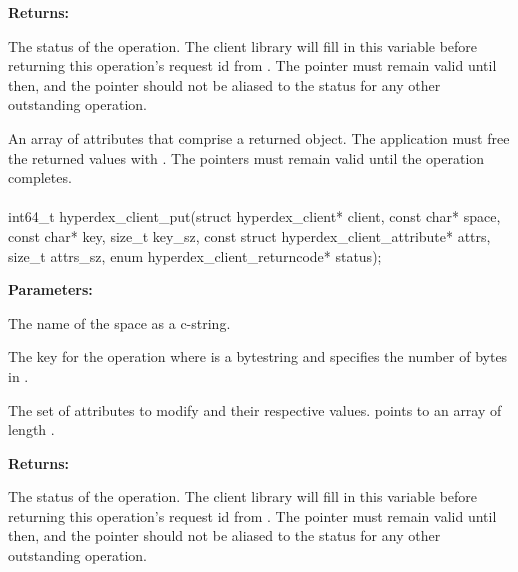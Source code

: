 \noindent\textbf{Returns:}
\begin{description}[labelindent=\widthof{{\code{attrs}, \code{attrs\_sz}}},leftmargin=*,noitemsep,nolistsep,align=right]
\item[\code{status}] The status of the operation.  The client library will fill in this variable before returning this operation's request id from .  The pointer must remain valid until then, and the pointer should not be aliased to the status for any other outstanding operation.
\item[\code{attrs}, \code{attrs\_sz}] An array of attributes that comprise a returned object.  The application must free the returned values with .  The pointers must remain valid until the operation completes.
\end{description}

\paragraph{}
\label{api:c:put}
\begin{ccode}
int64_t hyperdex_client_put(struct hyperdex_client* client,
        const char* space,
        const char* key, size_t key_sz,
        const struct hyperdex_client_attribute* attrs, size_t attrs_sz,
        enum hyperdex_client_returncode* status);
\end{ccode}
\funcdesc 

\noindent\textbf{Parameters:}
\begin{description}[labelindent=\widthof{{\code{attrs}, \code{attrs\_sz}}},leftmargin=*,noitemsep,nolistsep,align=right]
\item[\code{space}] The name of the space as a c-string.
\item[\code{key}, \code{key\_sz}] The key for the operation where  is a bytestring and  specifies the number of bytes in .
\item[\code{attrs}, \code{attrs\_sz}] The set of attributes to modify and their respective values.   points to an array of length .
\end{description}

\noindent\textbf{Returns:}
\begin{description}[labelindent=\widthof{{\code{status}}},leftmargin=*,noitemsep,nolistsep,align=right]
\item[\code{status}] The status of the operation.  The client library will fill in this variable before returning this operation's request id from .  The pointer must remain valid until then, and the pointer should not be aliased to the status for any other outstanding operation.
\end{description}

